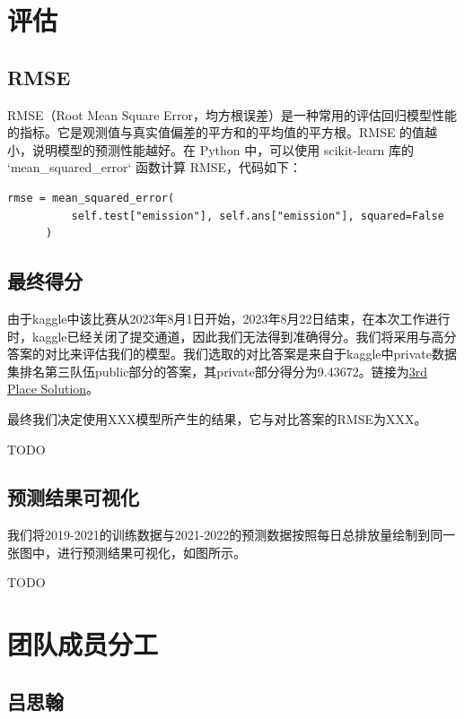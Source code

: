 \documentclass{ctexart}
\begin{document}
\section{评估}

\subsection{RMSE}

RMSE（Root Mean Square Error，均方根误差）是一种常用的评估回归模型性能的指标。它是观测值与真实值偏差的平方和的平均值的平方根。RMSE 的值越小，说明模型的预测性能越好。在 Python 中，可以使用 scikit-learn 库的 `mean\_squared\_error` 函数计算 RMSE，代码如下：

\begin{lstlisting}[style=Python]
      rmse = mean_squared_error(
          self.test["emission"], self.ans["emission"], squared=False
      )
\end{lstlisting}

\subsection{最终得分}

由于kaggle中该比赛从2023年8月1日开始，2023年8月22日结束，在本次工作进行时，kaggle已经关闭了提交通道，因此我们无法得到准确得分。我们将采用与高分答案的对比来评估我们的模型。我们选取的对比答案是来自于kaggle中private数据集排名第三队伍public部分的答案，其private部分得分为9.43672。链接为\href{https://www.kaggle.com/competitions/playground-series-s3e20/discussion/433822}{3rd Place Solution}。

最终我们决定使用XXX模型所产生的结果，它与对比答案的RMSE为XXX。

TODO

\subsection{预测结果可视化}

我们将2019-2021的训练数据与2021-2022的预测数据按照每日总排放量绘制到同一张图中，进行预测结果可视化，如图所示。

TODO

\section{团队成员分工}

\subsection{吕思翰}
\end{document}
